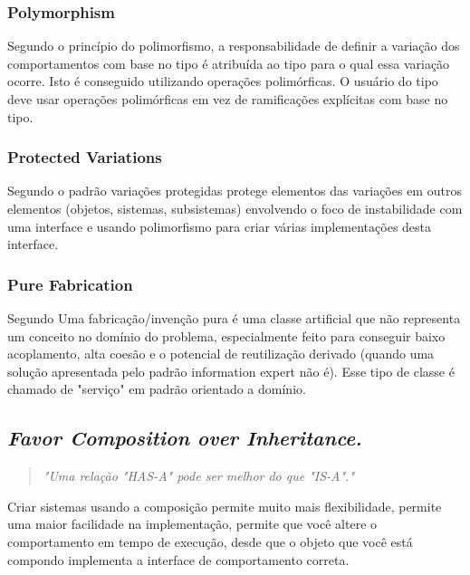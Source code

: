 \documentclass[12pt]{article}
\begin{document}
\subsubsection{Polymorphism} \label{sec:grasp}

Segundo \cite{CRAIG_LARMAN} o princípio do polimorfismo, a responsabilidade de definir a variação dos comportamentos com base no tipo é atribuída ao tipo para o qual essa variação ocorre. Isto é conseguido utilizando operações polimórficas. O usuário do tipo deve usar operações polimórficas em vez de ramificações explícitas com base no tipo.


\subsubsection{Protected Variations} \label{sec:grasp}

Segundo \cite{CRAIG_LARMAN} o padrão variações protegidas protege elementos das variações em outros elementos (objetos, sistemas, subsistemas) envolvendo o foco de instabilidade com uma interface e usando polimorfismo para criar várias implementações desta interface.

\subsubsection{Pure Fabrication} \label{sec:grasp}

Segundo \cite{CRAIG_LARMAN} Uma fabricação/invenção pura é uma classe artificial que não representa um conceito no domínio do problema, especialmente feito para conseguir baixo acoplamento, alta coesão e o potencial de reutilização derivado (quando uma solução apresentada pelo padrão information expert não é). Esse tipo de classe é chamado de "serviço" em padrão orientado a domínio.


\subsection{\textit{Favor Composition over Inheritance.}} \label{sec:favor_composition}
\begin{quote}
\textit{"Uma relação "HAS-A" pode ser melhor do que "IS-A"."}\cite{HEADFIRST_DESIGN_PATTERN}
\end{quote}

Criar sistemas usando a composição permite muito mais flexibilidade, permite uma maior facilidade na implementação, permite que você altere o comportamento em tempo de execução, desde que o objeto que você está compondo implementa a interface de comportamento correta. 
\end{document}
